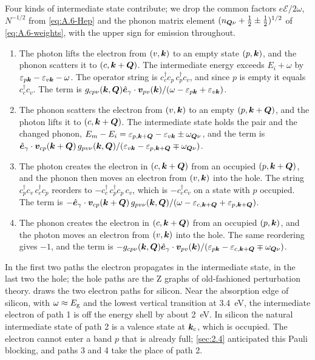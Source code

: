 Four kinds of intermediate state contribute; we drop the common factors $e\mathcal{E}/2\omega$, $N^{-1/2}$ from \cref{eq:A.6-Hep} and the phonon matrix element $(n_{\bm{Q}\nu} + \frac12 \pm \frac12)^{1/2}$ of \cref{eq:A.6-weights}, with the upper sign for emission throughout.
\begin{enumerate}
  \item The photon lifts the electron from $(v,\bm{k})$ to an empty state $(p,\bm{k})$, and the phonon scatters it to $(c,\bm{k}+\bm{Q})$. The intermediate energy exceeds $E_i + \omega$ by $\varepsilon_{p\bm{k}} - \varepsilon_{v\bm{k}} - \omega$. The operator string is $c^\dagger_cc_p\,c^\dagger_pc_v$, and since $p$ is empty it equals $c^\dagger_cc_v$. The term is $g_{cp\nu}(\bm{k},\bm{Q})\hat{\bm{e}}_\gamma\cdot\bm{v}_{pv}(\bm{k})/(\omega - \varepsilon_{p\bm{k}} + \varepsilon_{v\bm{k}})$.
  \item The phonon scatters the electron from $(v,\bm{k})$ to an empty $(p,\bm{k}+\bm{Q})$, and the photon lifts it to $(c,\bm{k}+\bm{Q})$. The intermediate state holds the pair and the changed phonon, $E_m - E_i = \varepsilon_{p,\bm{k}+\bm{Q}} - \varepsilon_{v\bm{k}} \pm \omega_{\bm{Q}\nu}$, and the term is $\hat{\bm{e}}_\gamma\cdot\bm{v}_{cp}(\bm{k}+\bm{Q})\,g_{pv\nu}(\bm{k},\bm{Q})/(\varepsilon_{v\bm{k}} - \varepsilon_{p,\bm{k}+\bm{Q}} \mp \omega_{\bm{Q}\nu})$.
  \item The photon creates the electron in $(c,\bm{k}+\bm{Q})$ from an occupied $(p,\bm{k}+\bm{Q})$, and the phonon then moves an electron from $(v,\bm{k})$ into the hole. The string $c^\dagger_pc_v\,c^\dagger_cc_p$ reorders to $-c^\dagger_c\,c^\dagger_pc_p\,c_v$, which is $-c^\dagger_cc_v$ on a state with $p$ occupied. The term is $-\hat{\bm{e}}_\gamma\cdot\bm{v}_{cp}(\bm{k}+\bm{Q})\,g_{pv\nu}(\bm{k},\bm{Q})/(\omega - \varepsilon_{c,\bm{k}+\bm{Q}} + \varepsilon_{p,\bm{k}+\bm{Q}})$.
  \item The phonon creates the electron in $(c,\bm{k}+\bm{Q})$ from an occupied $(p,\bm{k})$, and the photon moves an electron from $(v,\bm{k})$ into the hole. The same reordering gives $-1$, and the term is $-g_{cp\nu}(\bm{k},\bm{Q})\hat{\bm{e}}_\gamma\cdot\bm{v}_{pv}(\bm{k})/(\varepsilon_{p\bm{k}} - \varepsilon_{c,\bm{k}+\bm{Q}} \mp \omega_{\bm{Q}\nu})$.
\end{enumerate}
In the first two paths the electron propagates in the intermediate state, in the last two the hole; the hole paths are the Z graphs of old-fashioned perturbation theory.  draws the two electron paths for silicon. Near the absorption edge of silicon, with $\omega \approx E_{\mathrm{g}}$ and the lowest vertical transition at \SI{3.4}{eV}, the intermediate electron of path 1 is off the energy shell by about \SI{2}{eV}. In silicon the natural intermediate state of path 2 is a valence state at $\bm{k}_{\mathrm{c}}$, which is occupied. The electron cannot enter a band $p$ that is already full; \cref{sec:2.4} anticipated this Pauli blocking, and paths 3 and 4 take the place of path 2.

